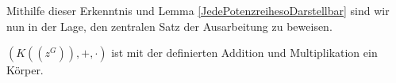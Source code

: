 %
%
%
%
%
%
%
%
%
% 
%
%
%
%
%
% 
%
%
%
Mithilfe dieser Erkenntnis und Lemma \ref{JedePotenzreihesoDarstellbar} sind wir nun in der Lage, den zentralen Satz der Ausarbeitung zu beweisen.
%
\begin{satz}
$\left(K\left(\left(z^{G}\right)\right), +, \cdot\right)$ ist mit der definierten Addition und Multiplikation ein Körper.
\end{satz}
